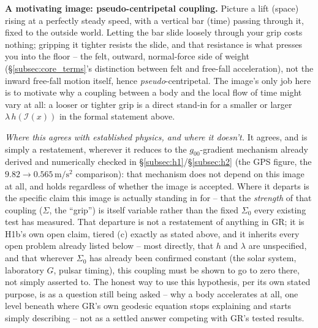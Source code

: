 \documentclass[12pt, a4paper]{article}
\begin{document}
\textbf{A motivating image: pseudo-centripetal coupling.} Picture a
lift (space) rising at a perfectly steady speed, with a vertical bar
(time) passing through it, fixed to the outside world. Letting the
bar slide loosely through your grip costs nothing; gripping it
tighter resists the slide, and that resistance is what presses you
into the floor -- the felt, outward, normal-force side of weight
(\S\ref{subsec:core_terms}'s distinction between felt and free-fall
acceleration), not the inward free-fall motion itself, hence
\emph{pseudo}-centripetal. The image's only job here is to motivate
why a coupling between a body and the local flow of time might vary
at all: a looser or tighter grip is a direct stand-in for a smaller or
larger $\lambda\,h(\mathcal{I}(x))$ in the formal statement above.

\emph{Where this agrees with established physics, and where it
doesn't.} It agrees, and is simply a restatement, wherever it
reduces to the $g_{00}$-gradient mechanism already derived and
numerically checked in \S\ref{subsec:h1}/\S\ref{subsec:h2} (the
GPS figure, the $9.82\to0.565\,\mathrm{m/s^2}$ comparison): that
mechanism does not depend on this image at all, and holds regardless
of whether the image is accepted. Where it departs is the specific
claim this image is actually standing in for -- that the
\emph{strength} of that coupling ($\Sigma$, the ``grip'') is itself
variable rather than the fixed $\Sigma_0$ every existing test has
measured. That departure is not a restatement of anything in GR; it
is H1b's own open claim, tiered (c) exactly as stated above, and it
inherits every open problem already listed below -- most directly,
that $h$ and $\lambda$ are unspecified, and that wherever $\Sigma_0$
has already been confirmed constant (the solar system, laboratory
$G$, pulsar timing), this coupling must be shown to go to zero there,
not simply asserted to. The honest way to use this hypothesis, per
its own stated purpose, is as a question still being asked -- why a
body accelerates at all, one level beneath where GR's own
geodesic equation stops explaining and starts simply describing --
not as a settled answer competing with GR's tested results.
\end{document}

